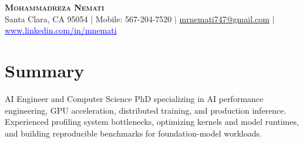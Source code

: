 \documentclass[letterpaper,13pt]{article}
\begin{document}
\begin{center}
    \textbf{\LARGE \scshape Mohammadreza Nemati} \\ \vspace{1pt}
    \small Santa Clara, CA 95054 $|$ Mobile: 567-204-7520 $|$
    \href{mailto:mrnemati747@gmail.com}{mrnemati747@gmail.com} $|$
    \href{https://www.linkedin.com/in/mnemati/}{\textcolor{blue}{\underline{www.linkedin.com/in/mnemati}}}
\end{center}

\section{Summary}
\small{AI Engineer and Computer Science PhD specializing in AI performance engineering, GPU acceleration, distributed training, and production inference. Experienced profiling system bottlenecks, optimizing kernels and model runtimes, and building reproducible benchmarks for foundation-model workloads.}
\vspace{0.05cm}
\end{document}
